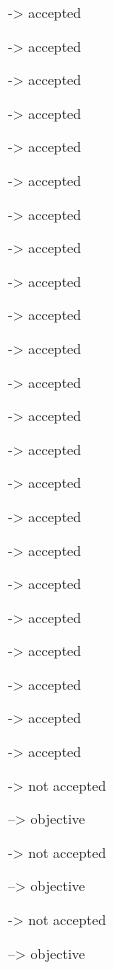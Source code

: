 -> accepted

-> accepted

-> accepted

-> accepted

-> accepted

-> accepted

-> accepted

-> accepted

-> accepted

-> accepted

-> accepted

-> accepted

-> accepted

-> accepted

-> accepted

-> accepted

-> accepted

-> accepted

-> accepted

-> accepted

-> accepted

-> accepted

-> accepted

-> not accepted

--> objective

-> not accepted

--> objective

-> not accepted

--> objective


